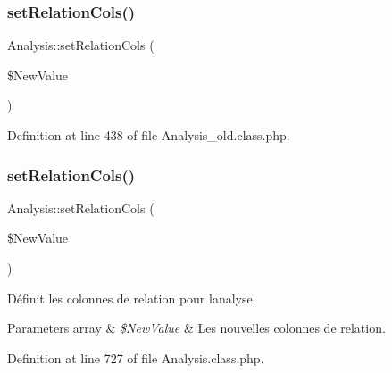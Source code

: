\mbox{\label{class_analysis_a860325e3da00ea1d669f0d458b66be5f}} 
\subsubsection{\texorpdfstring{set\+Relation\+Cols()}{setRelationCols()}\hspace{0.1cm}{\footnotesize\ttfamily [1/2]}}
{\footnotesize\ttfamily Analysis\+::set\+Relation\+Cols (\begin{DoxyParamCaption}\item[{}]{\$\+New\+Value }\end{DoxyParamCaption})}



Definition at line 438 of file Analysis\+\_\+old.\+class.\+php.

\mbox{\label{class_analysis_a860325e3da00ea1d669f0d458b66be5f}} 
\subsubsection{\texorpdfstring{set\+Relation\+Cols()}{setRelationCols()}\hspace{0.1cm}{\footnotesize\ttfamily [2/2]}}
{\footnotesize\ttfamily Analysis\+::set\+Relation\+Cols (\begin{DoxyParamCaption}\item[{}]{\$\+New\+Value }\end{DoxyParamCaption})}

Définit les colonnes de relation pour l\textquotesingle{}analyse.


\begin{DoxyParams}[1]{Parameters}
array & {\em \$\+New\+Value} & Les nouvelles colonnes de relation. \\
\hline
\end{DoxyParams}


Definition at line 727 of file Analysis.\+class.\+php.

\mbox{\label{class_analysis_ab921506f207e5b174d3cdef504721169}} 
